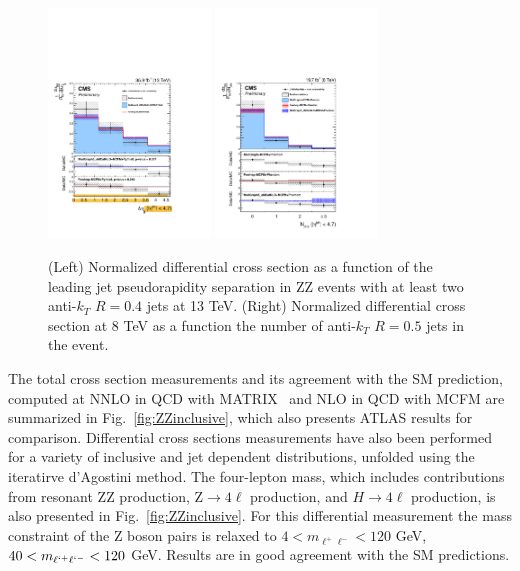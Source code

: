\documentclass[10pt]{article}
\begin{document}
\begin{figure}[htb]
  \centering
    \includegraphics[height=2.4in]{figures/ZZ_13TeV_dEtajj_unfolded.pdf}
    \includegraphics[height=2.4in]{figures/ZZ_8TeV_nJets_unfolded.pdf}
  \caption{(Left) Normalized differential cross section as a function of the
          leading jet pseudorapidity separation in ZZ events with at least
          two anti-$k_{T}$ $R=0.4$ jets at 13 TeV. 
          (Right) Normalized differential cross section at 8 TeV
          as a function the number of anti-$k_{T}$ $R=0.5$ jets in the event.}
  \label{fig:ZZjets}
\end{figure}
The total cross section measurements and its agreement with the SM
prediction, computed at NNLO in QCD with MATRIX~\cite{Cascioli:2014yka}\cite{Grazzini:2015hta} 
and NLO in QCD with MCFM
are summarized in Fig.~\ref{fig:ZZinclusive}, which also presents ATLAS results for comparison. 
Differential cross sections measurements have also been performed for a variety of inclusive 
and jet dependent distributions, unfolded using the iteratirve d'Agostini method. 
The four-lepton mass, which includes contributions 
from resonant ZZ production, Z$\rightarrow 4\ell$ production, and $H \rightarrow 4\ell$ production,
is also presented in Fig.~\ref{fig:ZZinclusive}.
For this differential measurement the mass constraint of the Z boson pairs is relaxed to
$4 < m_{\ell^{+}\ell^{-}} < 120$ GeV, $40 < m_{\ell`^{+}\ell`^{-}} < 120$ GeV. 
Results are in good agreement with the SM predictions.
\end{document}
